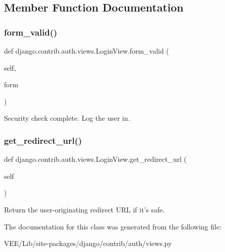 \subsection{Member Function Documentation}
\mbox{\label{classdjango_1_1contrib_1_1auth_1_1views_1_1_login_view_a579dcaf480c70b0e02887a5a35a7eae0}} 
\subsubsection{\texorpdfstring{form\+\_\+valid()}{form\_valid()}}
{\footnotesize\ttfamily def django.\+contrib.\+auth.\+views.\+Login\+View.\+form\+\_\+valid (\begin{DoxyParamCaption}\item[{}]{self,  }\item[{}]{form }\end{DoxyParamCaption})}

\begin{DoxyVerb}Security check complete. Log the user in.\end{DoxyVerb}
 \mbox{\label{classdjango_1_1contrib_1_1auth_1_1views_1_1_login_view_a8b4c3af080df3c4b69b0d8f422557c27}} 
\subsubsection{\texorpdfstring{get\+\_\+redirect\+\_\+url()}{get\_redirect\_url()}}
{\footnotesize\ttfamily def django.\+contrib.\+auth.\+views.\+Login\+View.\+get\+\_\+redirect\+\_\+url (\begin{DoxyParamCaption}\item[{}]{self }\end{DoxyParamCaption})}

\begin{DoxyVerb}Return the user-originating redirect URL if it's safe.\end{DoxyVerb}
 

The documentation for this class was generated from the following file\+:\begin{DoxyCompactItemize}
\item 
V\+E\+E/\+Lib/site-\/packages/django/contrib/auth/views.\+py\end{DoxyCompactItemize}
